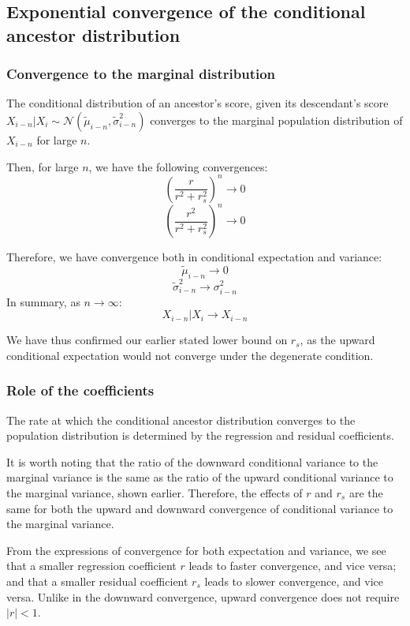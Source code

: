 \documentclass[a4paper,11pt]{article} %
\begin{document}
\subsection{Exponential convergence of the conditional ancestor distribution}

\subsubsection*{Convergence to the marginal distribution}
The conditional distribution of an ancestor's score, given its descendant's score $X_{i-n}|X_i \sim \mathcal{N}( \tilde{\mu}_{i-n}, \tilde{\sigma}_{i-n}^2)$ converges to the marginal population distribution of $X_{i-n}$ for large $n$.

Then, for large $n$, we have the following convergences:
$$(\frac{r}{r^2+r_s^2})^n \rightarrow 0$$
$$(\frac{r^2}{r^2+r_s^2})^n \rightarrow 0$$

Therefore, we have convergence both in conditional expectation and variance:
$$\tilde{\mu}_{i-n} \rightarrow 0$$
$$\tilde{\sigma}_{i-n}^2 \rightarrow \sigma_{i-n}^2$$
In summary, as $n \rightarrow \infty$:
$$X_{i-n}|X_i \rightarrow X_{i-n}$$

We have thus confirmed our earlier stated lower bound on $r_s$, as the upward conditional expectation would not converge under the degenerate condition.


\subsubsection*{Role of the coefficients}
The rate at which the conditional ancestor distribution converges to the population distribution is determined by the regression and residual coefficients. 

It is worth noting that the ratio of the downward conditional variance to the marginal variance is the same as the ratio of the upward conditional variance to the marginal variance, shown earlier. Therefore, the effects of $r$ and $r_s$ are the same for both the upward and downward convergence of conditional variance to the marginal variance.

From the expressions of convergence for both expectation and variance, we see that a smaller regression coefficient $r$ leads to faster convergence, and vice versa; and that a smaller residual coefficient $r_s$ leads to slower convergence, and vice versa. Unlike in the downward convergence, upward convergence does not require $|r| < 1$.
\end{document}
